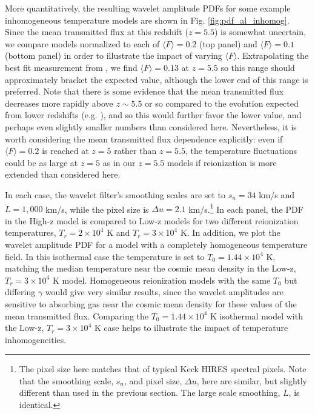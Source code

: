 More quantitatively, the resulting wavelet amplitude PDFs for some example inhomogeneous temperature models are shown in Fig. \ref{fig:pdf_al_inhomog}. Since the 
mean transmitted flux at this redshift ($z=5.5$) is somewhat uncertain, we compare models normalized to each of $\langle F \rangle=0.2$ (top panel) and $\langle F \rangle=0.1$ (bottom panel) in order
to illustrate the impact of varying $\langle F \rangle$. Extrapolating the best fit measurement from \citep{Becker:2012aq}, we find
$\langle F \rangle=0.13$ at $z=5.5$ so this range should approximately bracket the expected value, although the lower end of this range
is preferred. Note that there is some evidence that the mean transmitted flux decreases more rapidly above $z \sim 5.5$ or so compared to the evolution
expected from lower redshifts (e.g. \citealt{Fan:2005es}), and so this would
further favor the lower value, and perhaps even slightly smaller numbers than considered here. Nevertheless, it is worth considering the mean transmitted
flux dependence explicitly: even if $\langle F \rangle=0.2$ is reached at $z=5$ rather than $z=5.5$, the temperature fluctuations could be as large at $z=5$ as in our
$z=5.5$ models if reionization is more extended than considered here. 

In each case, the wavelet filter's smoothing scales are set to $s_n = 34$ km/s and $L=1,000$ km/s, while
the pixel size is $\Delta u = 2.1$ km/s.\footnote{The pixel size here matches that of typical Keck HIRES spectral pixels. Note that the smoothing scale, $s_n$, and pixel size, $\Delta u$, here are similar, but slightly different than used
in the previous section. The large scale smoothing, $L$, is identical.} In each panel, the PDF in the High-z model is compared to Low-z models for
two different reionization temperatures, $T_r = 2 \times 10^4$ K and $T_r = 3 \times 10^4$ K. In addition, we plot the wavelet amplitude PDF for a model
with a completely homogeneous temperature field. In this isothermal case the temperature is set to $T_0 = 1.44 \times 10^4$ K, matching the median
temperature near the cosmic mean density in the Low-z, $T_r = 3 \times 10^4$ K model. Homogeneous reionization 
models with the same $T_0$ but differing
$\gamma$ would give very similar results, since the wavelet amplitudes 
are sensitive to absorbing gas near the cosmic mean density for these values of the mean transmitted flux.
Comparing the $T_0 = 1.44 \times 10^4$ K isothermal model with the Low-z, $T_r = 3 \times 10^4$ K case helps to illustrate the impact of temperature
inhomogeneities.

